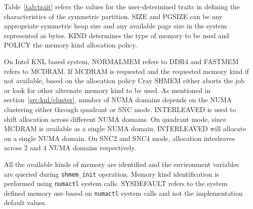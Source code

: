 Table~\ref{tab:trait} refers the values for the user-determined traits
in defining the characteristics of the symmetric partition. SIZE and PGSIZE
can be any appropriate symmetric heap size and any available page size in
the system represented as bytes. KIND determines the type of memory to be
used and POLICY the memory kind allocation policy.

On Intel KNL based system, NORMALMEM refers to DDR4 and FASTMEM refers to
MCDRAM. If MCDRAM is requested and the requested memory kind if not available,
based on the allocation policy Cray SHMEM either aborts the job or look for
other alternate memory kind to be used. As mentioned in
section~\ref{src:knl/cluster}, number of NUMA domains depends on the NUMA
clustering either through quadrant or SNC mode. INTERLEAVED is used to shift
allocation across different NUMA domains. On quadrant mode, since MCDRAM is
available as a single NUMA domain, INTERLEAVED will allocate on a single
NUMA domain. On SNC2 and SNC4 mode, allocation interleaves across 2 and 4
NUMA domains respectively.

All the available kinds of memory are identified and the environment
variables are queried during \texttt{shmem\_init} operation. Memory kind
identification is performed using \texttt{numactl} system calls. SYSDEFAULT
refers to the system defined memory use based on \texttt{numactl} system
calls and not the implementation default values.
